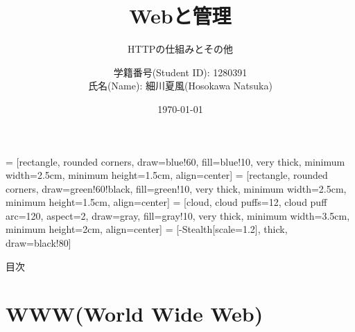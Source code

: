 \documentclass[11pt, aspectratio=169]{beamer}
\title{Webと管理}
\subtitle{HTTPの仕組みとその他}
\author{学籍番号(Student ID): 1280391 \\ 氏名(Name): 細川夏風(Hosokawa Natsuka)}
\institute{高知工科大学(Kochi Univ of Tech)}
\date{\today}
\begin{document}
 = [rectangle, rounded corners, draw=blue!60, fill=blue!10, very thick, minimum width=2.5cm, minimum height=1.5cm, align=center]
 = [rectangle, rounded corners, draw=green!60!black, fill=green!10, very thick, minimum width=2.5cm, minimum height=1.5cm, align=center]
 = [cloud, cloud puffs=12, cloud puff arc=120, aspect=2, draw=gray, fill=gray!10, very thick, minimum width=3.5cm, minimum height=2cm, align=center]
 = [-{Stealth[scale=1.2]}, thick, draw=black!80]

\begin{frame}
    \titlepage
\end{frame}

\begin{frame}{目次}
    \tableofcontents
\end{frame}


\section{WWW(World Wide Web)}
\end{document}
